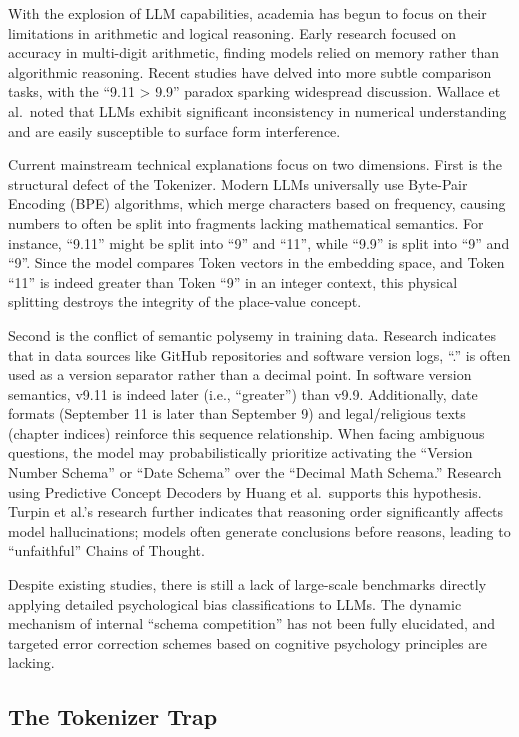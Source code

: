 With the explosion of LLM capabilities, academia has begun to focus on their limitations in arithmetic and logical reasoning. Early research focused on accuracy in multi-digit arithmetic, finding models relied on memory rather than algorithmic reasoning. Recent studies have delved into more subtle comparison tasks, with the “9.11 > 9.9” paradox sparking widespread discussion. Wallace et al. noted that LLMs exhibit significant inconsistency in numerical understanding and are easily susceptible to surface form interference.

Current mainstream technical explanations focus on two dimensions. First is the structural defect of the Tokenizer. Modern LLMs universally use Byte-Pair Encoding (BPE) algorithms, which merge characters based on frequency, causing numbers to often be split into fragments lacking mathematical semantics. For instance, “9.11” might be split into “9” and “11”, while “9.9” is split into “9” and “9”. Since the model compares Token vectors in the embedding space, and Token “11” is indeed greater than Token “9” in an integer context, this physical splitting destroys the integrity of the place-value concept.

Second is the conflict of semantic polysemy in training data. Research indicates that in data sources like GitHub repositories and software version logs, “.” is often used as a version separator rather than a decimal point. In software version semantics, v9.11 is indeed later (i.e., “greater”) than v9.9. Additionally, date formats (September 11 is later than September 9) and legal/religious texts (chapter indices) reinforce this sequence relationship. When facing ambiguous questions, the model may probabilistically prioritize activating the “Version Number Schema” or “Date Schema” over the “Decimal Math Schema.” Research using Predictive Concept Decoders by Huang et al. supports this hypothesis. Turpin et al.’s research further indicates that reasoning order significantly affects model hallucinations; models often generate conclusions before reasons, leading to “unfaithful” Chains of Thought.

Despite existing studies, there is still a lack of large-scale benchmarks directly applying detailed psychological bias classifications to LLMs. The dynamic mechanism of internal “schema competition” has not been fully elucidated, and targeted error correction schemes based on cognitive psychology principles are lacking.

\subsection{The Tokenizer Trap}

